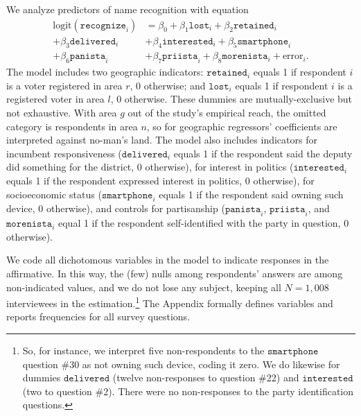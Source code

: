 \documentclass[letter,12pt]{article}
\begin{document}
We analyze predictors of name recognition with equation
\begin{equation*}
  \begin{split}
\text{logit}(\texttt{recognize}_i) & =   \beta_0
                                       + \beta_1\texttt{lost}_i
                                       + \beta_2\texttt{retained}_i \\
                                       + \beta_3\texttt{delivered}_i 
                                     & + \beta_4\texttt{interested}_i
                                       + \beta_5\texttt{smartphone}_i \\ 
                                       + \beta_6\texttt{panista}_i 
                                     & + \beta_7\texttt{priista}_i
                                       + \beta_8\texttt{morenista}_i
                                       + \text{error}_i.
  \end{split}
\end{equation*}
The model includes two geographic indicators: $\texttt{retained}_i$ equals 1 if respondent $i$ is a voter registered in area $r$, 0 otherwise; and $\texttt{lost}_i$ equals 1 if respondent $i$ is a registered voter in area $l$, 0 otherwise. These dummies are mutually-exclusive but not exhaustive. With area $g$ out of the study's empirical reach, the omitted category is respondents in area $n$, so for geographic regressors' coefficients are interpreted against no-man's land. The model also includes indicators for incumbent responsiveness ($\texttt{delivered}_i$ equals 1 if the respondent said the deputy did something for the district, 0 otherwise), for interest in politics ($\texttt{interested}_i$ equals 1 if the respondent expressed interest in politics, 0 otherwise), for socioeconomic status ($\texttt{smartphone}_i$ equals 1 if the respondent said owning such device, 0 otherwise), and controls for partisanship ($\texttt{panista}_i$, $\texttt{priista}_i$, and $\texttt{morenista}_i$ equal 1 if the respondent self-identified with the party in question, 0 otherwise).   

We code all dichotomous variables in the model to indicate responses in the affirmative. In this way, the (few) nulls among respondents' answers are among non-indicated values, and we do not lose any subject, keeping all $N=1,008$ interviewees in the estimation.\footnote{So, for instance, we interpret five non-respondents to the $\texttt{smartphone}$ question \#30 as not owning such device, coding it zero. We do likewise for dummies $\texttt{delivered}$ (twelve non-responses to question \#22) and $\texttt{interested}$ (two to question \#2). There were no non-responses to the party identification questions.} The Appendix formally defines variables and reports frequencies for all survey questions. 
\end{document}
